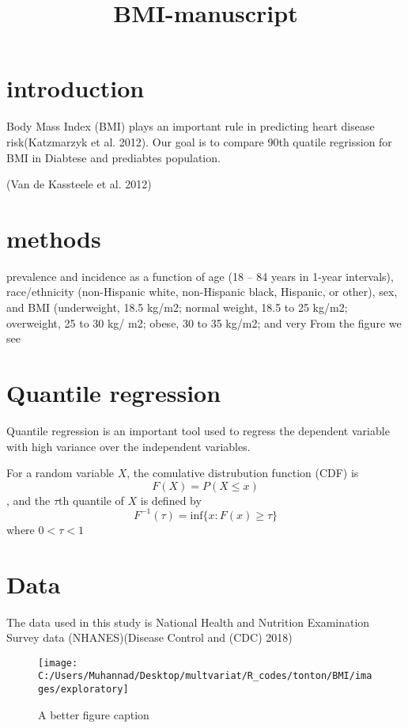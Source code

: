 \documentclass[]{article}
\title{BMI-manuscript}
\author{}
\date{\vspace{-2.5em}}
\begin{document}
\maketitle

{
\setcounter{tocdepth}{2}
\tableofcontents
}
\section{introduction}

Body Mass Index (BMI) plays an important rule in predicting heart
disease risk(Katzmarzyk et al. 2012). Our goal is to compare 90th
quatile regrission for BMI in Diabtese and prediabtes population.

(Van de Kassteele et al. 2012)

\section{methods}

prevalence and incidence as a function of age (18 -- 84 years in 1-year
intervals), race/ethnicity (non-Hispanic white, non-Hispanic black,
Hispanic, or other), sex, and BMI (underweight, 18.5 kg/m2; normal
weight, 18.5 to 25 kg/m2; overweight, 25 to 30 kg/ m2; obese, 30 to 35
kg/m2; and very From the figure we see

\section{Quantile regression}

Quantile regression is an important tool used to regress the dependent
variable with high variance over the independent variables.

For a random variable \(X\), the comulative distrubution function (CDF)
is \[F(X)=P(X\leq x)\], and the \(\tau\)th quantile of \(X\) is defined
by \[ F^{-1}(\tau)=\text{inf}\{x: F(x)\ge \tau\} \] where \(0<\tau<1\)

\section{Data}\label{data}

The data used in this study is National Health and Nutrition Examination
Survey data (NHANES)(Disease Control and (CDC) 2018)

\begin{figure}

{\centering \texttt{[image: C:/Users/Muhannad/Desktop/multvariat/R\_codes/tonton/BMI/images/exploratory]} 

}

\caption{A better figure caption}\label{fig:unnamed-chunk-1}
\end{figure}
\end{document}
